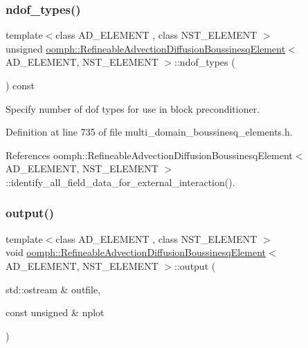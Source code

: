 \subsubsection{\texorpdfstring{ndof\+\_\+types()}{ndof\_types()}}
{\footnotesize\ttfamily template$<$class A\+D\+\_\+\+E\+L\+E\+M\+E\+NT , class N\+S\+T\+\_\+\+E\+L\+E\+M\+E\+NT $>$ \\
unsigned \hyperlink{classoomph_1_1RefineableAdvectionDiffusionBoussinesqElement}{oomph\+::\+Refineable\+Advection\+Diffusion\+Boussinesq\+Element}$<$ A\+D\+\_\+\+E\+L\+E\+M\+E\+NT, N\+S\+T\+\_\+\+E\+L\+E\+M\+E\+NT $>$\+::ndof\+\_\+types (\begin{DoxyParamCaption}{ }\end{DoxyParamCaption}) const\hspace{0.3cm}{\ttfamily [inline]}}



Specify number of dof types for use in block preconditioner. 



Definition at line 735 of file multi\+\_\+domain\+\_\+boussinesq\+\_\+elements.\+h.



References oomph\+::\+Refineable\+Advection\+Diffusion\+Boussinesq\+Element$<$ A\+D\+\_\+\+E\+L\+E\+M\+E\+N\+T, N\+S\+T\+\_\+\+E\+L\+E\+M\+E\+N\+T $>$\+::identify\+\_\+all\+\_\+field\+\_\+data\+\_\+for\+\_\+external\+\_\+interaction().

\mbox{\label{classoomph_1_1RefineableAdvectionDiffusionBoussinesqElement_a91bd582775205de08b7c0092acc82a0d}} 
\subsubsection{\texorpdfstring{output()}{output()}\hspace{0.1cm}{\footnotesize\ttfamily [1/4]}}
{\footnotesize\ttfamily template$<$class A\+D\+\_\+\+E\+L\+E\+M\+E\+NT , class N\+S\+T\+\_\+\+E\+L\+E\+M\+E\+NT $>$ \\
void \hyperlink{classoomph_1_1RefineableAdvectionDiffusionBoussinesqElement}{oomph\+::\+Refineable\+Advection\+Diffusion\+Boussinesq\+Element}$<$ A\+D\+\_\+\+E\+L\+E\+M\+E\+NT, N\+S\+T\+\_\+\+E\+L\+E\+M\+E\+NT $>$\+::output (\begin{DoxyParamCaption}\item[{std\+::ostream \&}]{outfile,  }\item[{const unsigned \&}]{nplot }\end{DoxyParamCaption})\hspace{0.3cm}{\ttfamily [inline]}}



